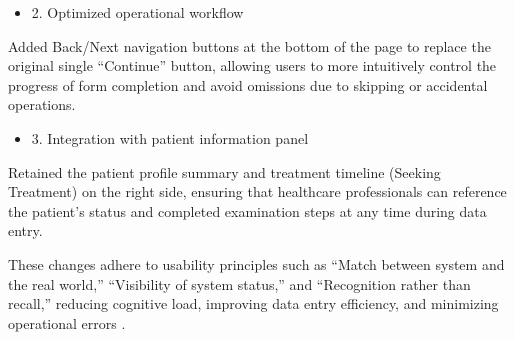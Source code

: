 \begin{itemize}
    \item 2. Optimized operational workflow
\end{itemize}
Added Back/Next navigation buttons at the bottom of the page to replace the original single “Continue” button, allowing users to more intuitively control the progress of form completion and avoid omissions due to skipping or accidental operations.

\begin{itemize}
    \item 3. Integration with patient information panel
\end{itemize}
Retained the patient profile summary and treatment timeline (Seeking Treatment) on the right side, ensuring that healthcare professionals can reference the patient's status and completed examination steps at any time during data entry.

These changes adhere to usability principles such as “Match between system and the real world,” “Visibility of system status,” and “Recognition rather than recall,” reducing cognitive load, improving data entry efficiency, and minimizing operational errors \cite{nielsen1995}.

